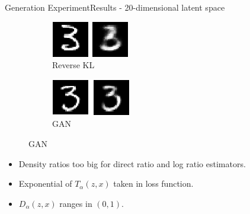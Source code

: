 \documentclass[handout]{beamer}
\begin{document}
\begin{frame}{Generation Experiment}{Results - 20-dimensional latent space}
\begin{table}[h]
\end{table}
\begin{figure}
\begin{subfigure}{0.49\textwidth}
\centering
\includegraphics[width=0.5\linewidth]{064834a.png}
\caption*{Reverse KL}
\end{subfigure}
\begin{subfigure}{0.49\textwidth}
\centering
\includegraphics[width=0.5\linewidth]{044944a.png}
\caption*{GAN}
\end{subfigure}
\end{figure}
\begin{itemize}
\item Density ratios too big for direct ratio and log ratio estimators.
\item Exponential of $T_\alpha(z,x)$ taken in loss function.
\item $D_\alpha(z,x)$ ranges in $(0,1)$.
\end{itemize}

\end{frame}
\end{document}
